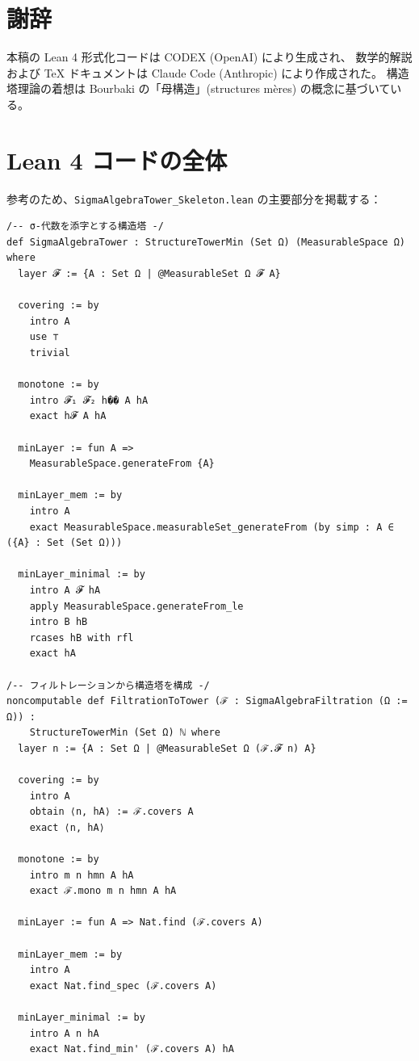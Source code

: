 \documentclass[a4paper,12pt]{ltjsarticle}
\theoremstyle{definition}
\begin{document}
\section*{謝辞}

本稿の Lean 4 形式化コードは CODEX (OpenAI) により生成され、
数学的解説および TeX ドキュメントは Claude Code (Anthropic) により作成された。
構造塔理論の着想は Bourbaki の「母構造」(structures mères) の概念に基づいている。

\appendix

\section{Lean 4 コードの全体}

参考のため、\texttt{SigmaAlgebraTower\_Skeleton.lean} の主要部分を掲載する：

\begin{verbatim}
/-- σ-代数を添字とする構造塔 -/
def SigmaAlgebraTower : StructureTowerMin (Set Ω) (MeasurableSpace Ω) where
  layer 𝓕 := {A : Set Ω | @MeasurableSet Ω 𝓕 A}

  covering := by
    intro A
    use ⊤
    trivial

  monotone := by
    intro 𝓕₁ 𝓕₂ h�� A hA
    exact h𝓕 A hA

  minLayer := fun A =>
    MeasurableSpace.generateFrom {A}

  minLayer_mem := by
    intro A
    exact MeasurableSpace.measurableSet_generateFrom (by simp : A ∈ ({A} : Set (Set Ω)))

  minLayer_minimal := by
    intro A 𝓕 hA
    apply MeasurableSpace.generateFrom_le
    intro B hB
    rcases hB with rfl
    exact hA

/-- フィルトレーションから構造塔を構成 -/
noncomputable def FiltrationToTower (ℱ : SigmaAlgebraFiltration (Ω := Ω)) :
    StructureTowerMin (Set Ω) ℕ where
  layer n := {A : Set Ω | @MeasurableSet Ω (ℱ.𝓕 n) A}

  covering := by
    intro A
    obtain ⟨n, hA⟩ := ℱ.covers A
    exact ⟨n, hA⟩

  monotone := by
    intro m n hmn A hA
    exact ℱ.mono m n hmn A hA

  minLayer := fun A => Nat.find (ℱ.covers A)

  minLayer_mem := by
    intro A
    exact Nat.find_spec (ℱ.covers A)

  minLayer_minimal := by
    intro A n hA
    exact Nat.find_min' (ℱ.covers A) hA
\end{verbatim}
\end{document}
